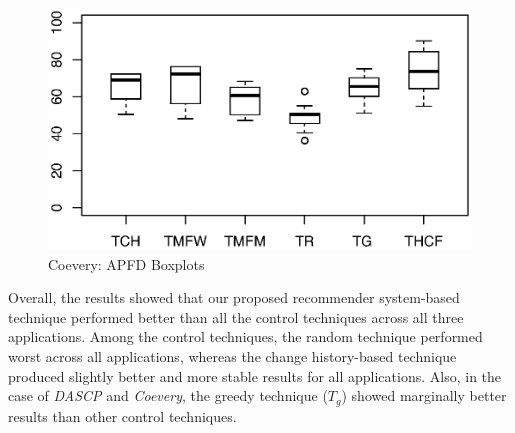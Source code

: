 \begin{figure}[!ht]
	\vspace*{-10pt}
	\centering
	\includegraphics[width=0.90\linewidth]{./CoeveryWGupdated.eps}
	\vspace*{-3pt}
	\caption{Coevery: APFD Boxplots}
	\label{fig:Coevery}
\end{figure}


Overall, the results showed that our proposed recommender 
system-based technique performed better than all the control techniques 
across all three applications. 
Among the control techniques, the random technique performed worst across all applications,
whereas the change history-based technique produced slightly better and more stable   
results for all applications.
Also, in the case of {\em DASCP} and {\em Coevery}, the greedy technique ($T_{g}$) 
showed marginally better results than other control techniques.

